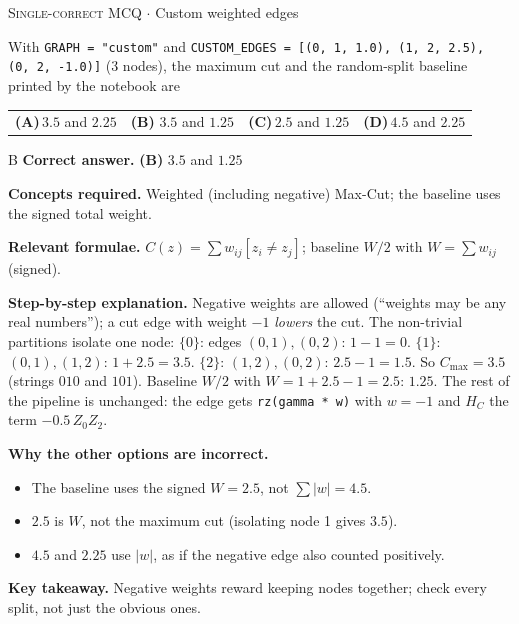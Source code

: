\documentclass[11pt,a4paper]{article}
\newcommand{\optlabel}[1]{\textbf{(#1)}}
\newcommand{\correctlabel}[1]{\textcolor{okgreen}{\textbf{(#1)}\,\ding{51}}}
\newenvironment{qitem}[1]{\begin{list}{}{\setlength{\leftmargin}{3.3em}\setlength{\labelwidth}{3.1em}%
  \setlength{\labelsep}{0.2em}\setlength{\topsep}{3pt}\setlength{\parsep}{3pt}}\item[\textbf{Q.#1}\hfill]}{\end{list}}
\newcommand{\qsep}{\par\vspace{2pt}{\color{black!15}\hrule}\vspace{4pt}}
\newcommand{\qmeta}[2]{{\footnotesize\color{black!60}\textsc{#1} \;$\cdot$\; #2}\par}
\begin{document}
\begin{qitem}{78}
\qmeta{Single-correct MCQ}{Custom weighted edges}
With \texttt{GRAPH = "custom"} and \texttt{CUSTOM\_EDGES = [(0, 1, 1.0), (1, 2, 2.5), (0, 2, -1.0)]} (3 nodes), the maximum cut and
the random-split baseline printed by the notebook are
\par\smallskip\noindent\begin{tabularx}{\linewidth}{@{}*{4}{L}@{}}
\optlabel{A}\,$3.5$ and $2.25$ & \correctlabel{B}\,$3.5$ and $1.25$ & \optlabel{C}\,$2.5$ and $1.25$ & \optlabel{D}\,$4.5$ and $2.25$
\end{tabularx}
\end{qitem}
\begin{solbox}{B}
\textbf{\color{brand}Correct answer.} \textcolor{okgreen}{\textbf{(B)}} $3.5$ and $1.25$

\textbf{\color{brand}Concepts required.} Weighted (including negative) Max-Cut; the baseline uses the signed total weight.

\textbf{\color{brand}Relevant formulae.} $C(z) = \sum w_{ij}[z_i\neq z_j]$; baseline $W/2$ with $W = \sum w_{ij}$ (signed).

\textbf{\color{brand}Step-by-step explanation.} Negative weights are allowed (``weights may be any real numbers''); a cut edge with weight $-1$ \emph{lowers} the cut.
The non-trivial partitions isolate one node: $\{0\}$: edges $(0,1), (0,2)$: $1 - 1 = 0$. $\{1\}$: $(0,1), (1,2)$: $1 + 2.5 = 3.5$.
$\{2\}$: $(1,2), (0,2)$: $2.5 - 1 = 1.5$. So $C_{\max} = 3.5$ (strings $010$ and $101$).
Baseline $W/2$ with $W = 1 + 2.5 - 1 = 2.5$: $1.25$. The rest of the pipeline is unchanged: the edge gets \texttt{rz(gamma * w)} with
$w = -1$ and $H_C$ the term $-0.5\,Z_0Z_2$.

\textbf{\color{brand}Why the other options are incorrect.}
\begin{itemize}[leftmargin=2.4em, itemsep=1pt, topsep=2pt]
\item[\textbf{(A)}] The baseline uses the signed $W = 2.5$, not $\sum|w| = 4.5$.
\item[\textbf{(C)}] $2.5$ is $W$, not the maximum cut (isolating node 1 gives $3.5$).
\item[\textbf{(D)}] $4.5$ and $2.25$ use $|w|$, as if the negative edge also counted positively.
\end{itemize}
\textbf{\color{brand}Key takeaway.} Negative weights reward keeping nodes together; check every split, not just the obvious ones.
\end{solbox}
\qsep
\end{document}
